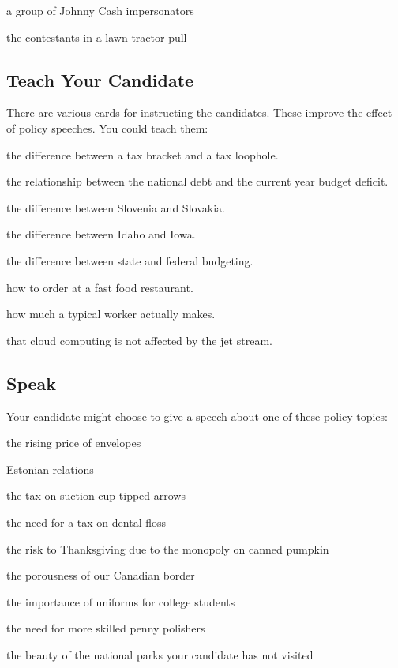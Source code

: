 \documentclass[twocolumn]{article}
\begin{document}
a group of Johnny Cash impersonators

the contestants in a lawn tractor pull

\subsection{Teach Your Candidate}

There are various cards for instructing the candidates. These improve the effect of policy speeches. You could teach them:

the difference between a tax bracket and a tax loophole.

the relationship between the national debt and the current year budget deficit.

the difference between Slovenia and Slovakia.

the difference between Idaho and Iowa.

the difference between state and federal budgeting.

how to order at a fast food restaurant.

how much a typical worker actually makes.

that cloud computing is not affected by the jet stream.

\subsection{Speak}

Your candidate might choose to give a speech about one of these policy topics:

the rising price of envelopes

Estonian relations

the tax on suction cup tipped arrows

the need for a tax on dental floss

the risk to Thanksgiving due to the monopoly on canned pumpkin

the porousness of our Canadian border

the importance of uniforms for college students

the need for more skilled penny polishers

the beauty of the national parks your candidate has not visited
\end{document}
